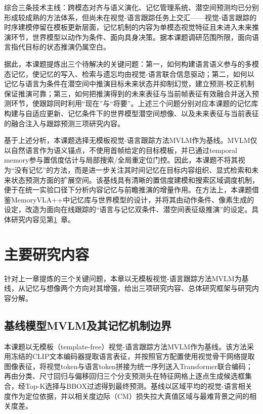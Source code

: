 综合三条技术主线：跨模态对齐与语义演化、记忆管理系统、潜空间预测均已分别形成较成熟的方法体系，但尚未在视觉-语言跟踪任务上交汇——视觉-语言跟踪的时序建模停留在模板更新层面，记忆机制的内容为单模态视觉特征且未进入未来推演环节，世界模型以动作为条件、面向具身决策。据本课题调研范围所限，面向语言指代目标的状态推演仍属空白。

据此，本课题提炼出三个待解决的关键问题：第一，如何构建语言语义参与的多模态记忆，使记忆的写入、检索与遗忘均由视觉-语言联合信息驱动；第二，如何以记忆与语言为条件在潜空间中推演目标未来状态并抑制幻觉，建立预测-校正机制保证推演可靠；第三，如何把推演得到的未来表征与当前帧表征有效融合并送入预测环节，使跟踪同时利用“现在”与“将要”。上述三个问题分别对应本课题的记忆库构建与自适应更新、记忆条件下的世界模型潜空间想像、以及未来表征与当前表征的融合注入与跟踪预测三项研究内容。

基于上述分析，本课题选择无模板视觉-语言跟踪方法MVLM\cite{park2026mvlm}作为基线。MVLM\cite{park2026mvlm}仅以自然语言作为语义锚点，不使用首帧给定的目标模板，并已通过temporal memory参与置信度估计与局部搜索/全局重定位门控。因此，本课题不将其视为“没有记忆”的方法，而是进一步关注其时间记忆在目标内容组织、显式检索和未来状态预测方面的扩展空间。该基线具有清晰的置信度建模和搜索区域调度机制，便于在统一实验口径下分析内容记忆与前瞻推演的增量作用。在方法上，本课题借鉴MemoryVLA++\cite{shi2026memoryvla}中记忆库与世界模型的设计，并将其由动作条件、像素生成的设定，改造为面向在线跟踪的“语言与记忆双条件、潜空间表征级推演”的设定。具体研究内容见第\ref{sec:content}~章。

\section{主要研究内容}
\label{sec:content}

针对上一章提炼的三个关键问题，本章以无模板视觉-语言跟踪方法MVLM\cite{park2026mvlm}为基线，从记忆与想像两个方向对其增强，给出三项研究内容、总体研究框架与研究内容分解。

\subsection{基线模型MVLM及其记忆机制边界}

本课题以无模板（template-free）视觉-语言跟踪方法MVLM\cite{park2026mvlm}作为基线。该方法采用冻结的CLIP\cite{radford2021clip}文本编码器提取语言表征，并按照官方配置使用视觉骨干网络提取图像表征，将视觉token与语言token拼接为统一序列送入Transformer联合编码；再由分类、尺寸回归与偏移回归三个分支预测头在特征网格上逐点生成候选框集合，经Top-K选择与BBOX过滤得到最终预测。基线以区域平均的视觉-语言相关度作为定位依据，并以相关度边际（CM）损失拉大真值区域与最难背景之间的相关度差。

